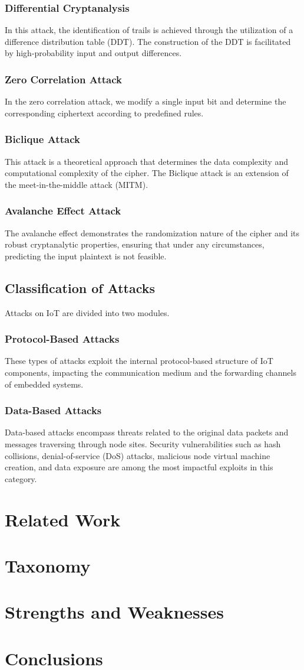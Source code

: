\documentclass[conference,compsoc]{IEEEtran}
\begin{document}
\subsubsection{Differential Cryptanalysis} 
In this attack, the identification of trails is achieved through the utilization of a difference distribution table (DDT). The construction of the DDT is facilitated by high-probability input and output differences.
\subsubsection{Zero Correlation Attack} 
In the zero correlation attack, we modify a single input bit and determine the corresponding ciphertext according to predefined rules.
\subsubsection{Biclique Attack} 
This attack is a theoretical approach that determines the data complexity and computational complexity of the cipher. The Biclique attack is an extension of the meet-in-the-middle attack (MITM).
\subsubsection{Avalanche Effect Attack} 
The avalanche effect demonstrates the randomization nature of the cipher and its robust cryptanalytic properties, ensuring that under any circumstances, predicting the input plaintext is not feasible.
\subsection{Classification of Attacks}
Attacks on IoT are divided into two modules.
\subsubsection{Protocol-Based Attacks} 
These types of attacks exploit the internal protocol-based structure of IoT components, impacting the communication medium and the forwarding channels of embedded systems.
\subsubsection{Data-Based Attacks} 
Data-based attacks encompass threats related to the original data packets and messages traversing through node sites. Security vulnerabilities such as hash collisions, denial-of-service (DoS) attacks, malicious node virtual machine creation, and data exposure are among the most impactful exploits in this category.

\section{Related Work}

\section{Taxonomy}

\section{Strengths and Weaknesses}

\section{Conclusions}



\end{document}
